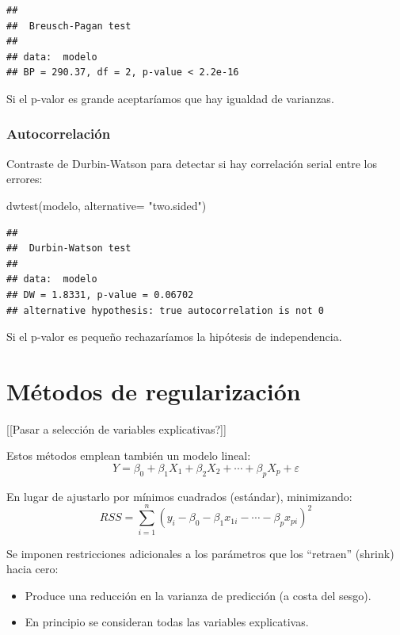 \documentclass[
]{book}
\newenvironment{Shaded}{\begin{snugshade}}{\end{snugshade}}
\newcommand{\AttributeTok}[1]{\textcolor[rgb]{0.77,0.63,0.00}{#1}}
\newcommand{\FunctionTok}[1]{\textcolor[rgb]{0.00,0.00,0.00}{#1}}
\newcommand{\NormalTok}[1]{#1}
\newcommand{\StringTok}[1]{\textcolor[rgb]{0.31,0.60,0.02}{#1}}
\theoremstyle{break}
\begin{document}
\begin{verbatim}
## 
##  Breusch-Pagan test
## 
## data:  modelo
## BP = 290.37, df = 2, p-value < 2.2e-16
\end{verbatim}

Si el p-valor es grande aceptaríamos que hay igualdad de varianzas.

\hypertarget{autocorrelaciuxf3n}{%
\subsubsection{Autocorrelación}\label{autocorrelaciuxf3n}}

Contraste de Durbin-Watson para detectar si hay correlación serial entre los errores:

\begin{Shaded}
\begin{Highlighting}[]
\FunctionTok{dwtest}\NormalTok{(modelo, }\AttributeTok{alternative=} \StringTok{"two.sided"}\NormalTok{)}
\end{Highlighting}
\end{Shaded}

\begin{verbatim}
## 
##  Durbin-Watson test
## 
## data:  modelo
## DW = 1.8331, p-value = 0.06702
## alternative hypothesis: true autocorrelation is not 0
\end{verbatim}

Si el p-valor es pequeño rechazaríamos la hipótesis de independencia.

\hypertarget{muxe9todos-de-regularizaciuxf3n}{%
\section{Métodos de regularización}\label{muxe9todos-de-regularizaciuxf3n}}

{[}{[}Pasar a selección de variables explicativas?{]}{]}

Estos métodos emplean también un modelo lineal:
\[Y=\beta_{0}+\beta_{1}X_{1}+\beta_{2}X_{2}+\cdots+\beta_{p}X_{p}+\varepsilon\]

En lugar de ajustarlo por mínimos cuadrados (estándar), minimizando:
\[ RSS = \sum\limits_{i=1}^{n}\left(  y_{i} - \beta_0 - \beta_1 x_{1i} - \cdots - \beta_p x_{pi} \right)^{2}\]

Se imponen restricciones adicionales a los parámetros que los
``retraen'' (shrink) hacia cero:

\begin{itemize}
\item
  Produce una reducción en la varianza de predicción (a
  costa del sesgo).
\item
  En principio se consideran todas las variables explicativas.
\end{itemize}
\end{document}
